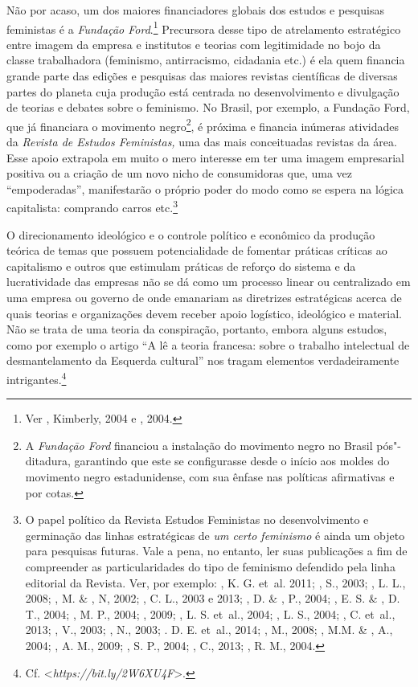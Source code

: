 Não por acaso, um dos maiores financiadores globais dos estudos e
pesquisas feministas é a \emph{Fundação Ford}.\footnote{Ver ,
  Kimberly, 2004 e , 2004.} Precursora desse tipo de atrelamento
estratégico entre imagem da empresa e institutos e teorias com
legitimidade no bojo da classe trabalhadora (feminismo, antirracismo,
cidadania etc.) é ela quem financia grande parte das edições e pesquisas
das maiores revistas científicas de diversas partes do planeta cuja
produção está centrada no desenvolvimento e divulgação de teorias e
debates sobre o feminismo. No Brasil, por exemplo, a Fundação Ford, que
já financiara o movimento negro\footnote{A \emph{Fundaçāo Ford}
  financiou a instalação do movimento negro no Brasil pós"-ditadura,
  garantindo que este se configurasse desde o início aos moldes do
  movimento negro estadunidense, com sua ênfase nas políticas
  afirmativas e por cotas.}, é próxima e financia inúmeras atividades da
\emph{Revista de Estudos Feministas,} uma das mais conceituadas revistas
da área. Esse apoio extrapola em muito o mero interesse em ter uma
imagem empresarial positiva ou a criação de um novo nicho de
consumidoras que, uma vez ``empoderadas'', manifestarão o próprio poder
do modo como se espera na lógica capitalista: comprando carros
etc.\footnote{O papel político da Revista Estudos Feministas no
  desenvolvimento e germinação das linhas estratégicas de \emph{um certo
  feminismo} é ainda um objeto para pesquisas futuras. Vale a pena, no
  entanto, ler suas publicações a fim de compreender as particularidades
  do tipo de feminismo defendido pela linha editorial da Revista. Ver,
  por exemplo: , K. G. et~al. 2011; , S., 2003; ,
  L. L., 2008; , M. \& , N, 2002; , C. L., 2003 e
  2013; , D. \& , P., 2004; , E. S. \& , D.
  T., 2004; , M. P., 2004; , 2009; , L. S. et~al.,
  2004; , L. S., 2004; , C. et~al., 2013; , V.,
  2003; , N., 2003; . D. E. et~al., 2014; , M., 2008;
  , M.M. \& , A., 2004; , A. M., 2009; , S.
  P., 2004; , C., 2013; , R. M., 2004.}

O direcionamento ideológico e o controle político e econômico da
produção teórica de temas que possuem potencialidade de fomentar
práticas críticas ao capitalismo e outros que estimulam práticas de
reforço do sistema e da lucratividade das empresas não se dá como um
processo linear ou centralizado em uma empresa ou governo de onde
emanariam as diretrizes estratégicas acerca de quais teorias e
organizações devem receber apoio logístico, ideológico e material. Não
se trata de uma teoria da conspiração, portanto, embora alguns estudos,
como por exemplo o artigo ``A  lê a teoria francesa: sobre o trabalho
intelectual de desmantelamento da Esquerda cultural'' nos tragam
elementos verdadeiramente intrigantes.\footnote{Cf.
  \textless{}\emph{https://bit.ly/2W6XU4F}\textgreater{}.}

